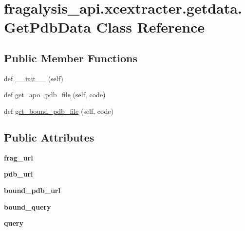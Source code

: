 \hypertarget{classfragalysis__api_1_1xcextracter_1_1getdata_1_1_get_pdb_data}{}\section{fragalysis\+\_\+api.\+xcextracter.\+getdata.\+Get\+Pdb\+Data Class Reference}
\label{classfragalysis__api_1_1xcextracter_1_1getdata_1_1_get_pdb_data}
\subsection*{Public Member Functions}
\begin{DoxyCompactItemize}
\item 
def \hyperlink{classfragalysis__api_1_1xcextracter_1_1getdata_1_1_get_pdb_data_abe03d6df71459bf479db778df7122186}{\+\_\+\+\_\+init\+\_\+\+\_\+} (self)
\item 
def \hyperlink{classfragalysis__api_1_1xcextracter_1_1getdata_1_1_get_pdb_data_a1785640f7d8841b41773f04577065366}{get\+\_\+apo\+\_\+pdb\+\_\+file} (self, code)
\item 
def \hyperlink{classfragalysis__api_1_1xcextracter_1_1getdata_1_1_get_pdb_data_afcb12b3a8f39a7d54917eefed0a1b4af}{get\+\_\+bound\+\_\+pdb\+\_\+file} (self, code)
\end{DoxyCompactItemize}
\subsection*{Public Attributes}
\begin{DoxyCompactItemize}
\item 
\mbox{\label{classfragalysis__api_1_1xcextracter_1_1getdata_1_1_get_pdb_data_a2cbb80e8804df35ddc3907e128bf5611}} 
{\bfseries frag\+\_\+url}
\item 
\mbox{\label{classfragalysis__api_1_1xcextracter_1_1getdata_1_1_get_pdb_data_a8b6633bc84797be7178323c1ff5d0474}} 
{\bfseries pdb\+\_\+url}
\item 
\mbox{\label{classfragalysis__api_1_1xcextracter_1_1getdata_1_1_get_pdb_data_a1edc9f29f240166dab511937439ab355}} 
{\bfseries bound\+\_\+pdb\+\_\+url}
\item 
\mbox{\label{classfragalysis__api_1_1xcextracter_1_1getdata_1_1_get_pdb_data_a69a3d1dd7ec122a02aff1945b82ee432}} 
{\bfseries bound\+\_\+query}
\item 
\mbox{\label{classfragalysis__api_1_1xcextracter_1_1getdata_1_1_get_pdb_data_ad09eb6782120b4d3114a9e5c3f66f373}} 
{\bfseries query}
\end{DoxyCompactItemize}


